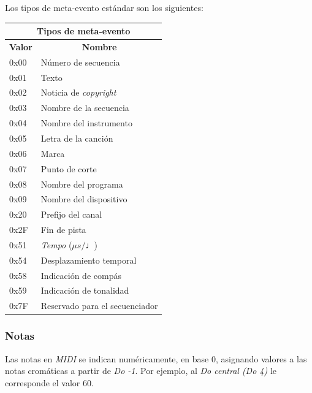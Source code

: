 \smallskip

Los tipos de meta-evento estándar son los siguientes:

\smallskip

\begin{center}
	\begin{tabular}{|l|l|}
		\hline \multicolumn{2}{|c|}{\textbf{Tipos de meta-evento}} \\
		\hline \multicolumn{1}{|c|}{\textbf{Valor}} & \multicolumn{1}{c|}{\textbf{Nombre}} \\
		\hline 0x00 & Número de secuencia \\
		\hline 0x01 & Texto \\
		\hline 0x02 & Noticia de \textit{copyright} \\
		\hline 0x03 & Nombre de la secuencia \\
		\hline 0x04 & Nombre del instrumento \\
		\hline 0x05 & Letra de la canción \\
		\hline 0x06 & Marca \\
		\hline 0x07 & Punto de corte \\
		\hline 0x08 & Nombre del programa \\
		\hline 0x09 & Nombre del dispositivo \\
		\hline 0x20 & Prefijo del canal \\
		\hline 0x2F & Fin de pista \\
		\hline 0x51 & \textit{Tempo} ($\mu s/\quarternote$) \\
		\hline 0x54 & Desplazamiento temporal \\
		\hline 0x58 & Indicación de compás \\
		\hline 0x59 & Indicación de tonalidad \\
		\hline 0x7F & Reservado para el secuenciador \\
		\hline 
	\end{tabular}
	\smallskip
\end{center}

\smallskip

\subsubsection{Notas}

Las notas en \textit{MIDI} se indican numéricamente, en base 0, asignando valores a las notas cromáticas a partir de \textit{Do -1}. Por ejemplo, al \textit{Do central (Do 4)} le corresponde el valor 60.

